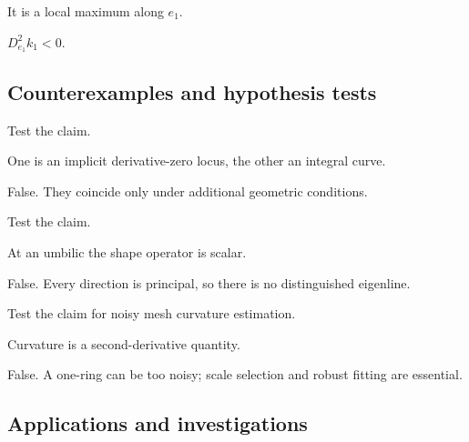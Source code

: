 \begin{hint}
It is a local maximum along \(e_1\).
\end{hint}

\begin{solution}
\(D_{e_1}^2k_1<0\).
\end{solution}

\subsection*{Counterexamples and hypothesis tests}

\begin{exercise}\label{exr:vii42-ped-10}
Test the claim.
\end{exercise}

\begin{hint}
One is an implicit derivative-zero locus, the other an integral curve.
\end{hint}

\begin{solution}
False.  They coincide only under additional geometric conditions.
\end{solution}

\begin{exercise}\label{exr:vii42-ped-11}
Test the claim.
\end{exercise}

\begin{hint}
At an umbilic the shape operator is scalar.
\end{hint}

\begin{solution}
False.  Every direction is principal, so there is no distinguished eigenline.
\end{solution}

\begin{exercise}\label{exr:vii42-ped-12}
Test the claim for noisy mesh curvature estimation.
\end{exercise}

\begin{hint}
Curvature is a second-derivative quantity.
\end{hint}

\begin{solution}
False.  A one-ring can be too noisy; scale selection and robust fitting are essential.
\end{solution}

\subsection*{Applications and investigations}

